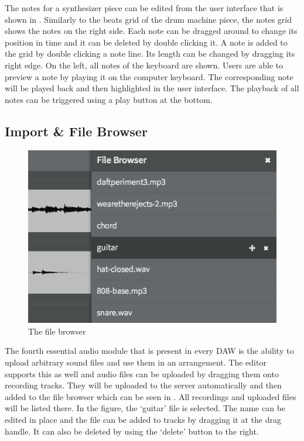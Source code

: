 The notes for a synthesizer piece can be edited from the user interface that is shown in . Similarly to the beats grid of the drum machine piece, the notes grid shows the notes on the right side. Each note can be dragged around to change its position in time and it can be deleted by double clicking it. A note is added to the grid by double clicking a note line. Its length can be changed by dragging its right edge. On the left, all notes of the keyboard are shown. Users are able to preview a note by playing it on the computer keyboard. The corresponding note will be played back and then highlighted in the user interface. The playback of all notes can be triggered using a play button at the bottom.

\subsection{Import \& File Browser}
\label{concept-import}

\begin{figure}[htb]
  \centerline{\includegraphics[width=.68\linewidth]{images/file-browser.png}}
  \caption[The file browser]{The file browser}
  \label{fig:editor-concept-file-browser}
\end{figure}

The fourth essential audio module that is present in every DAW is the ability to upload arbitrary sound files and use them in an arrangement. The editor supports this as well and audio files can be uploaded by dragging them onto recording tracks. They will be uploaded to the server automatically and then added to the file browser which can be seen in . All recordings and uploaded files will be listed there. In the figure, the `guitar' file is selected. The name can be edited in place and the file can be added to tracks by dragging it at the drag handle. It can also be deleted by using the `delete' button to the right.

